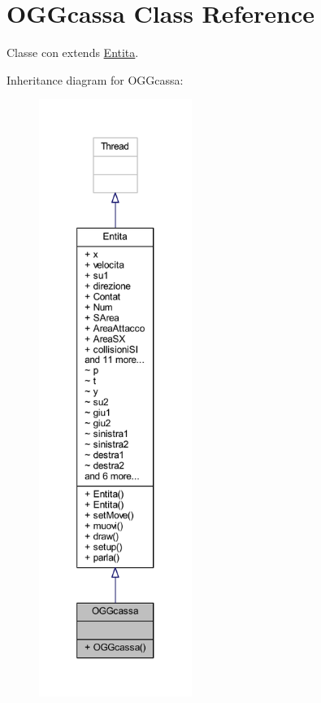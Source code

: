 \hypertarget{classoggetti_1_1_o_g_gcassa}{}\section{O\+G\+Gcassa Class Reference}
\label{classoggetti_1_1_o_g_gcassa}


Classe con extends \hyperlink{namespace_entita}{Entita}.  




Inheritance diagram for O\+G\+Gcassa\+:
\nopagebreak
\begin{figure}[H]
\begin{center}
\leavevmode
\includegraphics[height=550pt]{classoggetti_1_1_o_g_gcassa__inherit__graph}
\end{center}
\end{figure}


